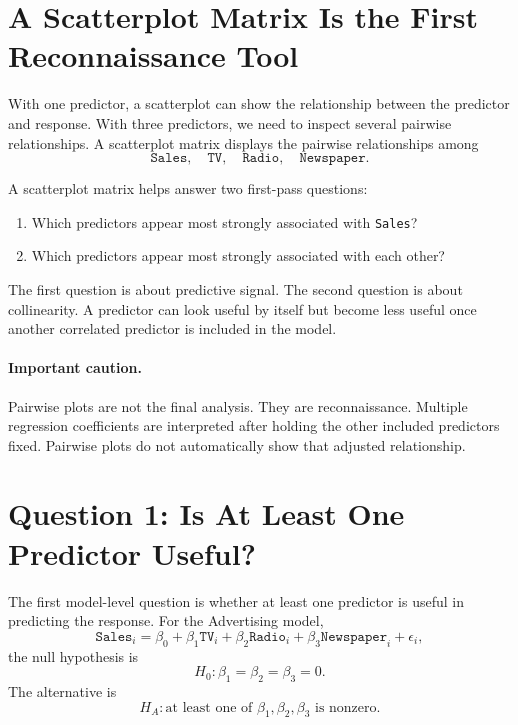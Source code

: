 \section{A Scatterplot Matrix Is the First Reconnaissance Tool}

With one predictor, a scatterplot can show the relationship between the predictor and response.  With three predictors, we need to inspect several pairwise relationships.  A scatterplot matrix displays the pairwise relationships among
\begin{equation}
  \texttt{Sales},\quad \texttt{TV},\quad \texttt{Radio},\quad \texttt{Newspaper}.
\end{equation}

A scatterplot matrix helps answer two first-pass questions:
\begin{enumerate}
  \item Which predictors appear most strongly associated with \texttt{Sales}?
  \item Which predictors appear most strongly associated with each other?
\end{enumerate}

The first question is about predictive signal.  The second question is about collinearity.  A predictor can look useful by itself but become less useful once another correlated predictor is included in the model.

\paragraph{Important caution.}
Pairwise plots are not the final analysis.  They are reconnaissance.  Multiple regression coefficients are interpreted after holding the other included predictors fixed.  Pairwise plots do not automatically show that adjusted relationship.

\section{Question 1: Is At Least One Predictor Useful?}

The first model-level question is whether at least one predictor is useful in predicting the response.  For the Advertising model,
\begin{equation}
  \texttt{Sales}_i
  =\beta_0
  +\beta_1\texttt{TV}_i
  +\beta_2\texttt{Radio}_i
  +\beta_3\texttt{Newspaper}_i
  +\epsilon_i,
\end{equation}
the null hypothesis is
\begin{equation}
  H_0:\beta_1=\beta_2=\beta_3=0.
\end{equation}
The alternative is
\begin{equation}
  H_A:\text{at least one of }\beta_1,\beta_2,\beta_3\text{ is nonzero.}
\end{equation}

